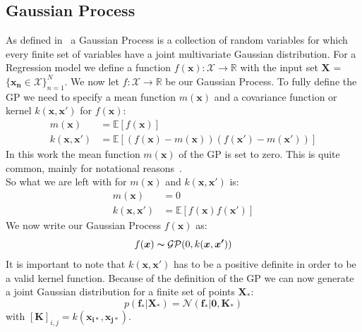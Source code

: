 \documentclass{article}
\begin{document}
\subsection{Gaussian Process} %
As defined in~\cite{RasmussenCarlEdward} a Gaussian Process is a collection of random variables for which every finite set of variables have a joint multivariate Gaussian distribution. For a Regression model we define a function $f(\bm{x}): \mathcal{X}\rightarrow \mathbb{R}$ with the input set ${\bm{X}}$ = $\{\bm{x_n} \in \mathcal{X} \}_{n=1}^N$. We now let $f: \mathcal{X}\rightarrow \mathbb{R}$ be our Gaussian Process.
To fully define the GP we need to specify a mean function $m(\bm{x})$ and a covariance function or kernel $k(\bm{x},\bm{x'})$ for $f(\bm{x})$:
\begin{equation}
\begin{aligned}
    m(\bm{x}) &= \mathbb{E}[f(\bm{x})]\\
    k(\bm{x},\bm{x'}) &= \mathbb{E}[(f(\bm{x})-m(\bm{x}))(f(\bm{x'})-m(\bm{x'}))]
\end{aligned}
\end{equation}
In this work the mean function $m(\bm{x})$ of the GP is set to zero. This is quite common, mainly for notational reasons~\cite{RasmussenCarlEdward}.\\
So what we are left with for  $m(\bm{x})$ and $ k(\bm{x},\bm{x'})$ is:
\begin{equation}
    \begin{aligned}
        m(\bm{x}) &= 0\\
        k(\bm{x},\bm{x'}) &= \mathbb{E}[f(\bm{x})f(\bm{x'})]
    \end{aligned}
    \end{equation}
We now write our Gaussian Process $f(\bm{x})$ as:
\begin{equation}
    f(\bm{x})\thicksim \mathcal{G} \mathcal{P}(0,k(\bm{x},\bm{x'})) 
\end{equation}
It is important to note that $ k(\bm{x},\bm{x'})$ has to be a positive definite in order to be a valid kernel function.
Because of the definition of the GP we can now generate a joint Gaussian distribution for a finite set of points $\bm{X_*}$:
\begin{equation}
    \label{eq:f_star_random_vector}
    p(\bm{f_*|\bm{X_*}}) = \mathcal{N}(\bm{f_*}|\bm{0},\bm{K_*})
\end{equation}
with ${[\bm{K}]}_{i,j} = k(\bm{x_{i*}},\bm{x_{j*}})$.
\end{document}
